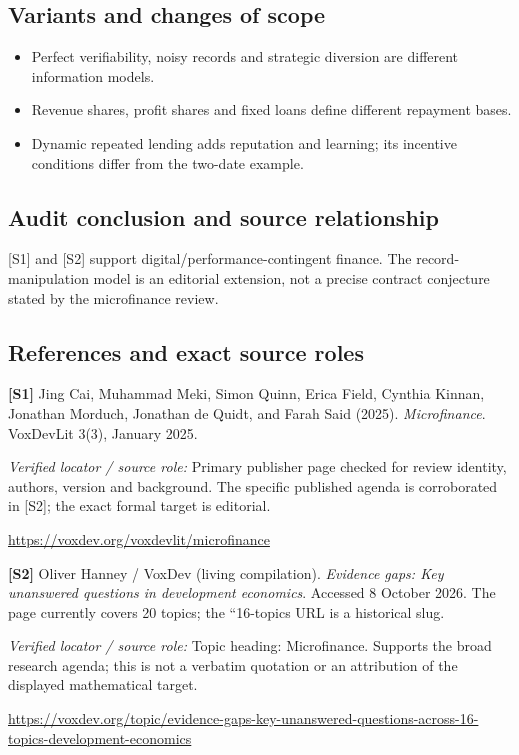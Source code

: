 \documentclass[11pt,a4paper]{article}
\begin{document}
\subsection*{Variants and changes of scope}

\begin{itemize}
\item Perfect verifiability, noisy records and strategic diversion are different information models.
\item Revenue shares, profit shares and fixed loans define different repayment bases.
\item Dynamic repeated lending adds reputation and learning; its incentive conditions differ from the two-date example.
\end{itemize}

\subsection*{Audit conclusion and source relationship}

[S1] and [S2] support digital/performance-contingent finance. The record-manipulation model is an editorial extension, not a precise contract conjecture stated by the microfinance review.

\subsection*{References and exact source roles}

{\footnotesize\raggedright
\par\noindent\textbf{[S1]} Jing Cai, Muhammad Meki, Simon Quinn, Erica Field, Cynthia Kinnan, Jonathan Morduch, Jonathan de Quidt, and Farah Said (2025). \emph{Microfinance}. VoxDevLit 3(3), January 2025.\par \textit{Verified locator / source role:} Primary publisher page checked for review identity, authors, version and background. The specific published agenda is corroborated in [S2]; the exact formal target is editorial.\par \url{https://voxdev.org/voxdevlit/microfinance}\par\smallskip
\par\noindent\textbf{[S2]} Oliver Hanney / VoxDev (living compilation). \emph{Evidence gaps: Key unanswered questions in development economics}. Accessed 8 October 2026. The page currently covers 20 topics; the ``16-topics URL is a historical slug.\par \textit{Verified locator / source role:} Topic heading: Microfinance. Supports the broad research agenda; this is not a verbatim quotation or an attribution of the displayed mathematical target.\par \url{https://voxdev.org/topic/evidence-gaps-key-unanswered-questions-across-16-topics-development-economics}\par\smallskip
}
\end{document}
